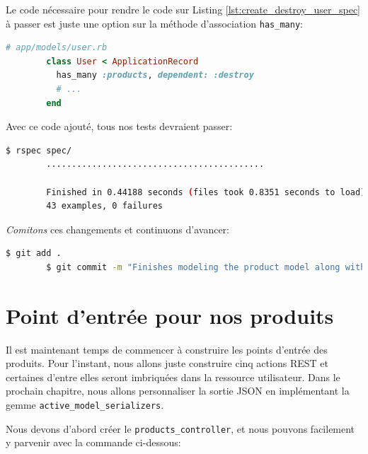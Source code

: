 \documentclass[]{report}
\begin{document}
      Le code nécessaire pour rendre le code sur Listing \ref{lst:create_destroy_user_spec} à passer est juste une option sur la méthode d'association \verb|has_many|:

      \begin{scriptsize}
        \begin{lstlisting}[language=ruby]
        # app/models/user.rb
        class User < ApplicationRecord
          has_many :products, dependent: :destroy
          # ...
        end
        \end{lstlisting}
      \end{scriptsize}

      Avec ce code ajouté, tous nos tests devraient passer:

      \begin{scriptsize}
        \begin{lstlisting}[language=bash]
        $ rspec spec/
        ...........................................

        Finished in 0.44188 seconds (files took 0.8351 seconds to load)
        43 examples, 0 failures
        \end{lstlisting}
      \end{scriptsize}

      \textit{Comitons} ces changements et continuons d'avancer:

      \begin{scriptsize}
        \begin{lstlisting}[language=bash]
        $ git add .
        $ git commit -m "Finishes modeling the product model along with user associations"
        \end{lstlisting}
      \end{scriptsize}

  \section{Point d'entrée pour nos produits}

    Il est maintenant temps de commencer à construire les points d'entrée des produits. Pour l'instant, nous allons juste construire cinq actions REST et certaines d'entre elles seront imbriquées dans la ressource utilisateur. Dans le prochain chapitre, nous allons personnaliser la sortie JSON en implémentant la gemme \verb|active_model_serializers|.

    Nous devons d'abord créer le \verb|products_controller|, et nous pouvons facilement y parvenir avec la commande ci-dessous:
\end{document}
